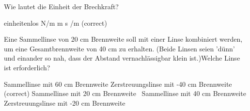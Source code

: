 \documentclass[11pt]{exam}
\begin{document}
\begin{questions}
\vspace{3mm}\question Wie lautet die Einheit der Brechkraft?

\begin{choices}
	\choice einheitenlos
	\choice N/m
	\choice m
	\choice s
	/m (correct)
\end{choices}

\vspace{3mm}\question Eine Sammellinse von 20 cm Brennweite soll mit einer Linse kombiniert werden, um eine Gesamtbrennweite von 40 cm zu erhalten. (Beide Linsen seien ’dünn’ und einander so nah, dass der Abstand vernachlässigbar klein ist.)Welche Linse ist erforderlich?

\begin{choices}
	\choice Sammellinse mit 60 cm Brennweite
	\choice Zerstreuungslinse mit -40 cm Brennweite (correct)
	\choice Sammellinse mit 20 cm Brennweite
	\choice  Sammellinse mit 40 cm Brennweite
	\choice Zerstreuungslinse mit -20 cm Brennweite
\end{choices}

\vspace{3mm}\end{questions}
\end{document}
